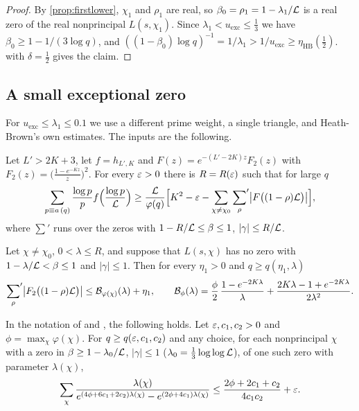 \begin{proof}
By \cref{prop:firstlower}, $\chi_1$ and $\rho_1$ are real, so $\beta_0=\rho_1=1-\lambda_1/\mathcal{L}$ is a real zero of the
real nonprincipal $L(s,\chi_1)$. Since $\lambda_1<u_{\mathrm{exc}}\le\frac13$ we have $\beta_0\ge1-1/(3\log q)$, and
$((1-\beta_0)\log q)^{-1}=1/\lambda_1>1/u_{\mathrm{exc}}\ge\eta_{\mathrm{HB}}(\frac12)$.  with $\delta=\frac12$ gives the claim.
\end{proof}

\subsection{A small exceptional zero}
For $u_{\mathrm{exc}}\le\lambda_1\le0.1$ we use a different prime weight, a single triangle, and Heath-Brown's own
estimates. The inputs are the following.

\begin{inp}\label{inp:hb132}
Let $L'>2K+3$, let $f=h_{L',K}$ and $F(z)=e^{-(L'-2K)z}F_2(z)$ with $F_2(z)=\bigl(\frac{1-e^{-Kz}}z\bigr)^2$. For
every $\varepsilon>0$ there is $R=R(\varepsilon)$ such that for large $q$
\[
  \sum_{p\equiv a\,(q)}\frac{\log p}pf\Bigl(\frac{\log p}{\mathcal{L}}\Bigr)\ge\frac{\mathcal{L}}{\varphi(q)}\Bigl[K^2-\varepsilon-\sum_{\chi\ne\chi_0}{\sum_\rho}'
  \bigl|F\bigl((1-\rho)\mathcal{L}\bigr)\bigr|\Bigr],
\]
where $\sum'$ runs over the zeros with $1-R/\mathcal{L}\le\beta\le1$, $|\gamma|\le R/\mathcal{L}$.
\end{inp}

\begin{inp}\label{inp:hb133}
Let $\chi\ne\chi_0$, $0<\lambda\le R$, and suppose that $L(s,\chi)$ has no zero with $1-\lambda/\mathcal{L}<\beta\le1$ and
$|\gamma|\le1$. Then for every $\eta_1>0$ and $q\ge q(\eta_1,\lambda)$
\[
  {\sum_\rho}'\bigl|F_2\bigl((1-\rho)\mathcal{L}\bigr)\bigr|\le\mathcal B_{\varphi(\chi)}(\lambda)+\eta_1,\qquad
  \mathcal B_\phi(\lambda)=\frac\phi2\,\frac{1-e^{-2K\lambda}}\lambda+\frac{2K\lambda-1+e^{-2K\lambda}}{2\lambda^2}.
\]
\end{inp}

\begin{inp}\label{inp:hb111}
In the notation of \cite[Lemma~11.1]{HeathBrown1992zero} and
\cite[(5.18), p.~66]{Xylouris2011nullstellen}, the following holds.
Let $\varepsilon,c_1,c_2>0$ and $\phi=\max_\chi\varphi(\chi)$. For $q\ge q(\varepsilon,c_1,c_2)$ and any choice, for each
nonprincipal $\chi$ with a zero in $\beta\ge1-\lambda_0/\mathcal{L}$, $|\gamma|\le1$ ($\lambda_0=\frac13\log\log\mathcal{L}$), of one such zero
with parameter $\lambda(\chi)$,
\[
  \sum_\chi\frac{\lambda(\chi)}{e^{(4\phi+6c_1+2c_2)\lambda(\chi)}-e^{(2\phi+4c_1)\lambda(\chi)}}\le\frac{2\phi+2c_1+c_2}{4c_1c_2}+\varepsilon .
\]
\end{inp}

